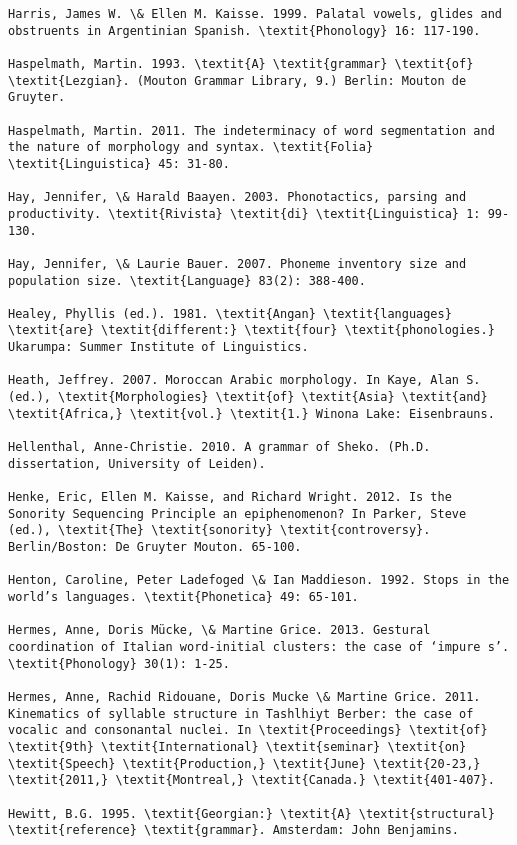 \begin{verbatim}
Harris, James W. \& Ellen M. Kaisse. 1999. Palatal vowels, glides and obstruents in Argentinian Spanish. \textit{Phonology} 16: 117-190.

Haspelmath, Martin. 1993. \textit{A} \textit{grammar} \textit{of} \textit{Lezgian}. (Mouton Grammar Library, 9.) Berlin: Mouton de Gruyter.

Haspelmath, Martin. 2011. The indeterminacy of word segmentation and the nature of morphology and syntax. \textit{Folia} \textit{Linguistica} 45: 31-80.

Hay, Jennifer, \& Harald Baayen. 2003. Phonotactics, parsing and productivity. \textit{Rivista} \textit{di} \textit{Linguistica} 1: 99-130.

Hay, Jennifer, \& Laurie Bauer. 2007. Phoneme inventory size and population size. \textit{Language} 83(2): 388-400.

Healey, Phyllis (ed.). 1981. \textit{Angan} \textit{languages} \textit{are} \textit{different:} \textit{four} \textit{phonologies.} Ukarumpa: Summer Institute of Linguistics.

Heath, Jeffrey. 2007. Moroccan Arabic morphology. In Kaye, Alan S. (ed.), \textit{Morphologies} \textit{of} \textit{Asia} \textit{and} \textit{Africa,} \textit{vol.} \textit{1.} Winona Lake: Eisenbrauns.

Hellenthal, Anne-Christie. 2010. A grammar of Sheko. (Ph.D. dissertation, University of Leiden).

Henke, Eric, Ellen M. Kaisse, and Richard Wright. 2012. Is the Sonority Sequencing Principle an epiphenomenon? In Parker, Steve (ed.), \textit{The} \textit{sonority} \textit{controversy}. Berlin/Boston: De Gruyter Mouton. 65-100.

Henton, Caroline, Peter Ladefoged \& Ian Maddieson. 1992. Stops in the world’s languages. \textit{Phonetica} 49: 65-101.

Hermes, Anne, Doris Mücke, \& Martine Grice. 2013. Gestural coordination of Italian word-initial clusters: the case of ‘impure s’. \textit{Phonology} 30(1): 1-25.

Hermes, Anne, Rachid Ridouane, Doris Mucke \& Martine Grice. 2011. Kinematics of syllable structure in Tashlhiyt Berber: the case of vocalic and consonantal nuclei. In \textit{Proceedings} \textit{of} \textit{9th} \textit{International} \textit{seminar} \textit{on} \textit{Speech} \textit{Production,} \textit{June} \textit{20-23,} \textit{2011,} \textit{Montreal,} \textit{Canada.} \textit{401-407}.

Hewitt, B.G. 1995. \textit{Georgian:} \textit{A} \textit{structural} \textit{reference} \textit{grammar}. Amsterdam: John Benjamins.


\end{verbatim}
